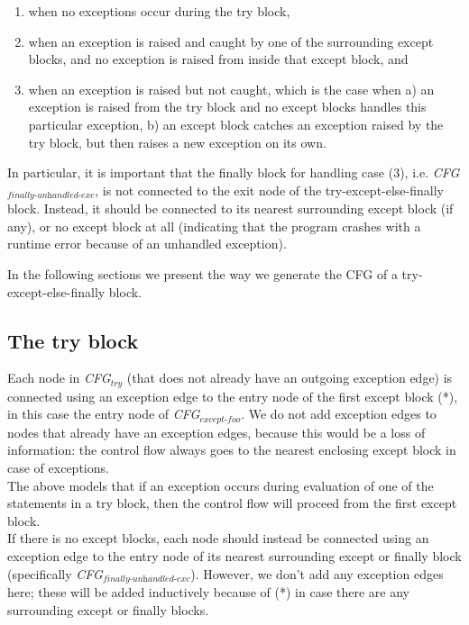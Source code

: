 \begin{enumerate}
  \item when no exceptions occur during the try block,
  \item when an exception is raised and caught by one of the surrounding except blocks, and no exception is raised from inside that except block, and
  \item when an exception is raised but not caught, which is the case when 
    a) an exception is raised from the try block and no except blocks handles this particular exception, 
    b) an except block catches an exception raised by the try block, but then raises a new exception on its own.
\end{enumerate}

\begin{sloppypar}
  In particular, it is important that the finally block for handling case (3), i.e. \textit{CFG$_{\textit{finally-unhandled-exc}}$}, 
  is not connected to the exit node of the try-except-else-finally block. Instead, it should be connected to its nearest surrounding except block (if any), 
  or no except block at all (indicating that the program crashes with a runtime error because of an unhandled exception).
\end{sloppypar}

In the following sections we present the way we generate the CFG of a try-except-else-finally block.



\subsection{The try block}
Each node in \textit{CFG$_{\textit{try}}$} (that does not already have an outgoing exception edge) is connected using an exception edge to the entry node of the first except block (*), in this case the entry node of \textit{CFG$_{\textit{except-foo}}$}. We do not add exception edges to nodes that already have an exception edges, because this would be a loss of information: the control flow always goes to the nearest enclosing except block in case of exceptions. \\
The above models that if an exception occurs during evaluation of one of the statements in a try block, then the control flow will proceed from the first except block. \\
If there is no except blocks, each node should instead be connected using an exception edge to the entry node of its nearest surrounding except or finally block (specifically \textit{CFG$_{\textit{finally-unhandled-exc}}$}). However, we don't add any exception edges here; these will be added inductively because of (*) in case there are any surrounding except or finally blocks.

